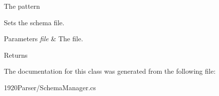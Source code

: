 The pattern 

Sets the schema file. 


\begin{DoxyParams}{Parameters}
{\em file} & The file.\\
\hline
\end{DoxyParams}
\begin{DoxyReturn}{Returns}

\end{DoxyReturn}


The documentation for this class was generated from the following file\+:\begin{DoxyCompactItemize}
\item 
1920\+Parser/Schema\+Manager.\+cs\end{DoxyCompactItemize}
